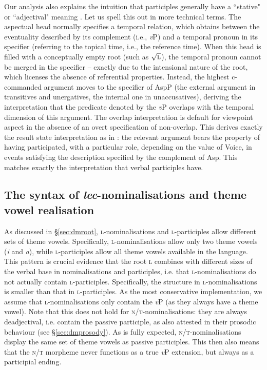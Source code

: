\documentclass[output=paper,colorlinks,citecolor=brown]{langscibook}
\begin{document}
Our analysis also explains the intuition that participles generally have a ``stative" or ``adjectival" meaning \citep{Kratzer2000, ramchand2018, tatevosov2017, Borik2019}. Let us spell this out in more technical terms. The aspectual head normally specifies a temporal relation, which obtains between the eventuality described by its complement (i.e., \textit{v}P) and a temporal pronoun in its specifier (referring to the topical time, i.e., the reference time). When this head is filled with a conceptually empty root (such as $\sqrt{\textsc{l}}$), the temporal pronoun cannot be merged in the specifier -- exactly due to the intensional nature of the root, which licenses the absence of referential properties. Instead, the highest c-commanded argument moves to the specifier of AspP (the external argument in transitives and unergatives, the internal one in unaccusatives), deriving the interpretation that the predicate denoted by the \textit{v}P overlaps with the temporal dimension of this argument. The overlap interpretation is default for viewpoint aspect in the absence of an overt specification of non-overlap. This derives exactly the result state interpretation as in \citet{Kratzer2000}: the relevant argument bears the property of having participated, with a particular role, depending on the value of Voice, in events satisfying the description specified by the complement of Asp. This matches exactly the interpretation that verbal participles have.


\subsection{The syntax of \textit{lec}-nominalisations and theme vowel realisation}

As discussed in \S \ref{sec:dmroot}, \textsc{l}-nominalisations and \textsc{l}-participles allow different sets of theme vowels. Specifically, \textsc{l}-nominalisations allow only two theme vowels (\textit{i} and \textit{a}), while \textsc{l}-participles allow all theme vowels available in the language. This pattern is crucial evidence that the root \textsc{l} combines with different sizes of the verbal base in nominalisations and participles, i.e. that \textsc{l}-nominalisations do not actually contain \textsc{l}-participles. Specifically, the structure in \textsc{l}-nominalisations is smaller than that in \textsc{l}-participles. As the most conservative implementation, we assume that \textsc{l}-nominalisations only contain the \textit{v}P (as they always have a theme vowel). Note that this does not hold for \textsc{n/t}-nominalisations: they are always deadjectival, i.e. contain the passive participle, as also attested in their prosodic behaviour (see \S \ref{sec:dmprosody}). As is fully expected, \textsc{n/t}-nominalisations display the same set of theme vowels as passive participles. This then also means that the \textsc{n/t} morpheme never functions as a true \textit{v}P extension, but always as a participial ending.
\end{document}
